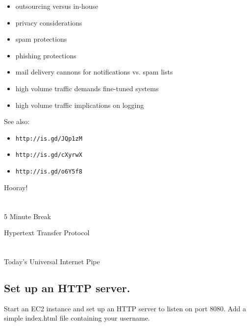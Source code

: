 \documentclass[xga]{xdvislides}
\begin{document}
\begin{itemize}
	\item outsourcing versus in-house
	\item privacy considerations
	\item spam protections
	\item phishing protections
	\item mail delivery cannons for notifications vs. spam lists
	\item high volume traffic demands fine-tuned systems
	\item high volume traffic implications on logging
\end{itemize}
\vspace{.5in}
See also:
\begin{itemize}
	\item {\tt http://is.gd/JQp1zM}
	\item {\tt http://is.gd/cXyrwX}
	\item {\tt http://is.gd/o6Y5f8}
\end{itemize}

\newpage
\vspace*{\fill}
\begin{center}
    \Hugesize
        Hooray! \\ [1em]
    \hspace*{5mm}
    \blueline\\
    \hspace*{5mm}\\
        5 Minute Break
\end{center}
\vspace*{\fill}

\newpage
\vspace*{\fill}
\begin{center}
	\Hugesize
		Hypertext Transfer Protocol\\ [1em]
	\hspace*{5mm}
	\blueline\\
	\hspace*{5mm}\\
		Today's Universal Internet Pipe
\end{center}
\vspace*{\fill}

\subsection{Set up an HTTP server.}

\vspace*{\fill}
Start an EC2 instance and set up an HTTP server to listen on port 8080.
Add a simple index.html file containing your username.
\end{document}
